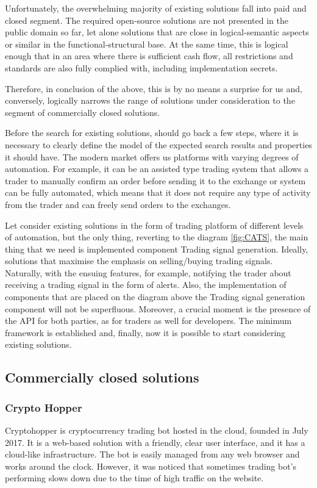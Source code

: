\documentclass[thesis=B,english]{FITthesis}[2019/03/06]
\begin{document}
Unfortunately, the overwhelming majority of existing solutions fall into paid and closed segment. The required open-source solutions are not presented in the public domain so far, let alone solutions that are close in logical-semantic aspects or similar in the functional-structural base. At the same time, this is logical enough that in an area where there is sufficient cash flow, all restrictions and standards are also fully complied with, including implementation secrets.

Therefore, in conclusion of the above, this is by no means a surprise for us and, conversely, logically narrows the range of solutions under consideration to the segment of commercially closed solutions.

Before the search for existing solutions, should go back a few steps, where it is necessary to clearly define the model of the expected search results and properties it should have.
The modern market offers us platforms with varying degrees of automation. For example, it can be an assisted type trading system that allows a trader to manually confirm an order before sending it to the exchange or system can be fully automated, which means that it does not require any type of activity from the trader and can freely send orders to the exchanges.

Let consider existing solutions in the form of trading platform of different levels of automation, but the only thing, reverting to the diagram \ref{fig:CATS}, the main thing that we need is implemented component Trading signal generation. Ideally, solutions that maximise the emphasis on selling/buying trading signals. Naturally, with the ensuing features, for example, notifying the trader about receiving a trading signal in the form of alerts. Also, the implementation of components that are placed on the diagram above the Trading signal generation component will not be superfluous. Moreover, a crucial moment is the presence of the API for both parties, as for traders as well for developers. The minimum framework is established and, finally, now it is possible to start considering existing solutions.

\subsection{Commercially closed solutions}

\subsubsection{Crypto Hopper \cite{noauthor_cryptohopper_nodate}}
Cryptohopper is cryptocurrency trading bot hosted in the cloud, founded in July 2017. It is a web-based solution with a friendly, clear user interface, and it has a cloud-like infrastructure. The bot is easily managed from any web browser and works around the clock. However, it was noticed that sometimes trading bot's performing slows down due to the time of high traffic on the website. 
\end{document}
